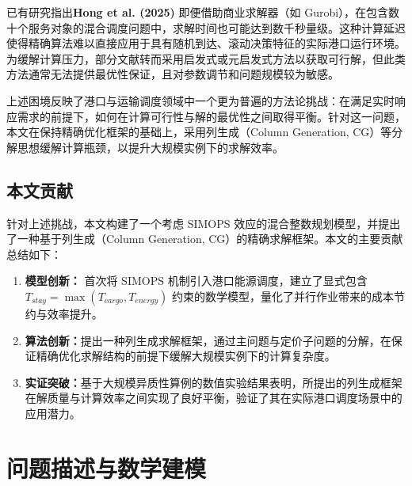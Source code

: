 \documentclass[UTF8, a4paper, 12pt]{ctexart}
\begin{document}
已有研究指出\textbf{Hong et al. (2025)} \cite{Hong2025} 即便借助商业求解器（如 Gurobi），在包含数十个服务对象的混合调度问题中，求解时间也可能达到数千秒量级。这种计算延迟使得精确算法难以直接应用于具有随机到达、滚动决策特征的实际港口运行环境。为缓解计算压力，部分文献转而采用启发式或元启发式方法以获取可行解，但此类方法通常无法提供最优性保证，且对参数调节和问题规模较为敏感。

上述困境反映了港口与运输调度领域中一个更为普遍的方法论挑战：在满足实时响应需求的前提下，如何在计算可行性与解的最优性之间取得平衡。针对这一问题，本文在保持精确优化框架的基础上，采用列生成（Column Generation, CG）等分解思想缓解计算瓶颈，以提升大规模实例下的求解效率。

\subsection{本文贡献}
针对上述挑战，本文构建了一个考虑 SIMOPS 效应的混合整数规划模型，并提出了一种基于列生成（Column Generation, CG）的精确求解框架。本文的主要贡献总结如下：
\begin{enumerate}
    \item \textbf{模型创新：} 首次将 SIMOPS 机制引入港口能源调度，建立了显式包含 $T_{stay} = \max(T_{cargo}, T_{energy})$ 约束的数学模型，量化了并行作业带来的成本节约与效率提升。
    \item \textbf{算法创新：}提出一种列生成求解框架，通过主问题与定价子问题的分解，在保证精确优化求解结构的前提下缓解大规模实例下的计算复杂度。
    \item \textbf{实证突破：}基于大规模异质性算例的数值实验结果表明，所提出的列生成框架在解质量与计算效率之间实现了良好平衡，验证了其在实际港口调度场景中的应用潜力。
\end{enumerate}



\section{问题描述与数学建模}
\label{sec:model}
\end{document}
